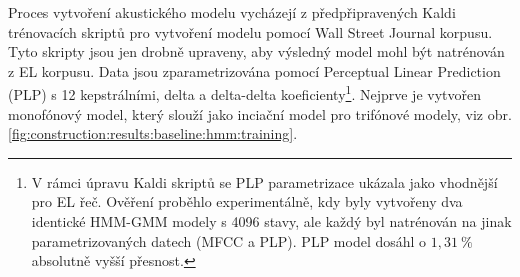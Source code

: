 


Proces vytvoření akustického modelu vycházejí z předpřipravených Kaldi trénovacích skriptů pro vytvoření modelu pomocí Wall Street Journal korpusu. Tyto skripty jsou jen drobně upraveny, aby výsledný model mohl být natrénován z EL korpusu. Data jsou zparametrizována pomocí Perceptual Linear Prediction (PLP) s 12 kepstrálními, delta a delta-delta koeficienty\footnote{V rámci úpravu Kaldi skriptů se PLP parametrizace ukázala jako vhodnější pro EL řeč. Ověření proběhlo experimentálně, kdy byly vytvořeny dva identické HMM-GMM modely s 4096 stavy, ale každý byl natrénován na jinak parametrizovaných datech (MFCC a PLP). PLP model dosáhl o $1,31\ \%$ absolutně vyšší přesnost.}. Nejprve je vytvořen monofónový model, který slouží jako inciační model pro trifónové  modely, viz obr. \ref{fig:construction:results:baseline:hmm:training}.


